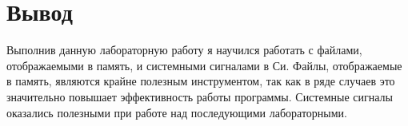 \section{Вывод}

Выполнив данную лабораторную работу я научился работать с файлами, отображаемыми в память, и системными сигналами в Си. Файлы, отображаемые в память, являются крайне полезным инструментом, так как в ряде случаев это значительно повышает эффективность работы программы. Системные сигналы оказались полезными при работе над последующими лабораторными.

